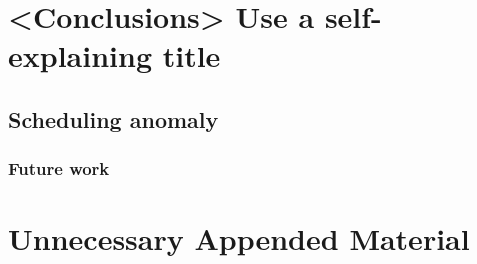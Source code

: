 \documentclass{kththesis}
\begin{document}
\chapter{<Conclusions> Use a self-explaining title}

\section{Scheduling anomaly}



\subsection{Future work}



\printbibliography[heading=bibintoc] 

\appendix

\chapter{Unnecessary Appended Material}
\end{document}
